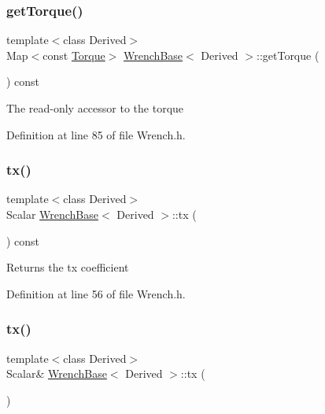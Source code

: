 \subsubsection{\texorpdfstring{get\+Torque()}{getTorque()}\hspace{0.1cm}{\footnotesize\ttfamily [2/2]}}
{\footnotesize\ttfamily template$<$class Derived$>$ \\
Map$<$const \hyperlink{class_wrench_base_a8fa1b5e32e8418247118cc24be70d68d}{Torque}$>$ \hyperlink{class_wrench_base}{Wrench\+Base}$<$ Derived $>$\+::get\+Torque (\begin{DoxyParamCaption}{ }\end{DoxyParamCaption}) const\hspace{0.3cm}{\ttfamily [inline]}}

The read-\/only accessor to the torque 

Definition at line 85 of file Wrench.\+h.

\hypertarget{class_wrench_base_a28eccf6ee6ec9a0e8ad6f0a130c17f0a}{}\label{class_wrench_base_a28eccf6ee6ec9a0e8ad6f0a130c17f0a} 
\subsubsection{\texorpdfstring{tx()}{tx()}\hspace{0.1cm}{\footnotesize\ttfamily [1/2]}}
{\footnotesize\ttfamily template$<$class Derived$>$ \\
Scalar \hyperlink{class_wrench_base}{Wrench\+Base}$<$ Derived $>$\+::tx (\begin{DoxyParamCaption}{ }\end{DoxyParamCaption}) const\hspace{0.3cm}{\ttfamily [inline]}}

\begin{DoxyReturn}{Returns}
the {\ttfamily tx} coefficient 
\end{DoxyReturn}


Definition at line 56 of file Wrench.\+h.

\hypertarget{class_wrench_base_a6f0a892dcdd42565538c3a979550a0ef}{}\label{class_wrench_base_a6f0a892dcdd42565538c3a979550a0ef} 
\subsubsection{\texorpdfstring{tx()}{tx()}\hspace{0.1cm}{\footnotesize\ttfamily [2/2]}}
{\footnotesize\ttfamily template$<$class Derived$>$ \\
Scalar\& \hyperlink{class_wrench_base}{Wrench\+Base}$<$ Derived $>$\+::tx (\begin{DoxyParamCaption}{ }\end{DoxyParamCaption})\hspace{0.3cm}{\ttfamily [inline]}}

